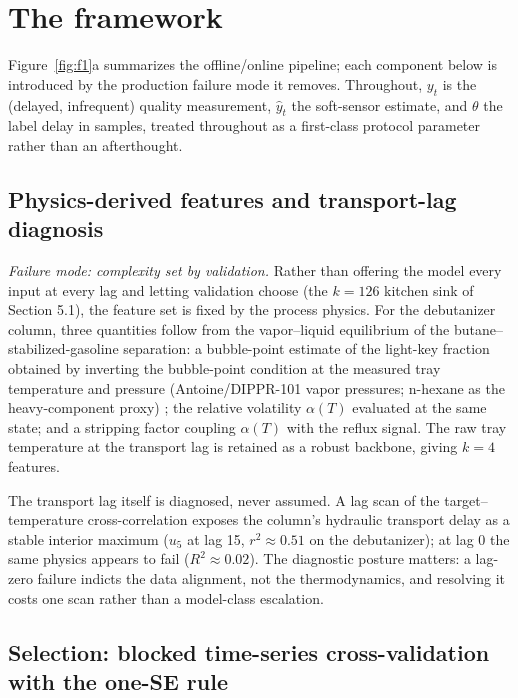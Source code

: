 \section{The framework}
\label{sec:framework}

Figure~\ref{fig:f1}a summarizes the offline/online pipeline; each component below is introduced
by the production failure mode it removes. Throughout, \(y_t\) is the (delayed,
infrequent) quality measurement, \(\hat{y}_t\) the soft-sensor estimate, and \(\theta\) the
label delay in samples, treated throughout as a first-class protocol parameter rather than an afterthought.

\subsection{Physics-derived features and transport-lag diagnosis}

\emph{Failure mode: complexity set by validation.} Rather than offering the model every
input at every lag and letting validation choose (the \(k = 126\) kitchen sink of
Section 5.1), the feature set is fixed by the process physics. For the debutanizer
column, three quantities follow from the vapor--liquid equilibrium of the
butane--stabilized-gasoline separation: a bubble-point estimate of the light-key
fraction obtained by inverting the bubble-point condition at the measured tray
temperature and pressure (Antoine/DIPPR-101 vapor pressures; n-hexane as the
heavy-component proxy) \citep{smith2018}; the relative volatility \(\alpha(T)\)
evaluated at the same state; and a stripping factor coupling \(\alpha(T)\) with the
reflux signal. The raw tray temperature at the transport lag is retained as a robust
backbone, giving \(k = 4\) features.

The transport lag itself is diagnosed, never assumed. A lag scan of the
target--temperature cross-correlation exposes the column's hydraulic transport delay as
a stable interior maximum (\(u_5\) at lag 15, \(r^2 \approx 0.51\) on the debutanizer); at
lag 0 the same physics appears to fail (\(R^2 \approx 0.02\)). The diagnostic posture
matters: a lag-zero failure indicts the data alignment, not the thermodynamics, and
resolving it costs one scan rather than a model-class escalation.

\subsection{Selection: blocked time-series cross-validation with the one-SE rule}

